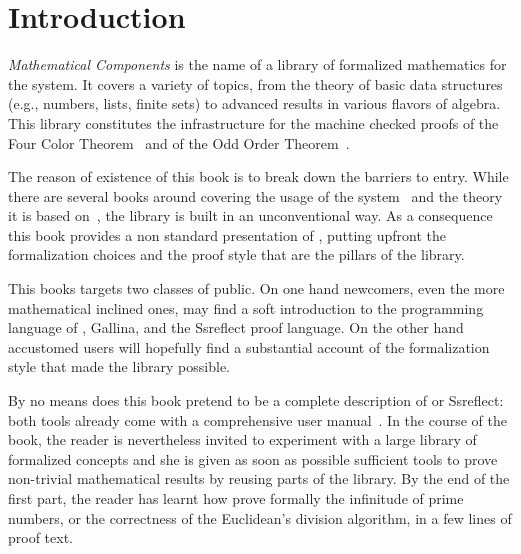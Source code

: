 \setcounter{chapter}{-1}
\chapter{Introduction}

\emph{Mathematical Components}
is the name of a library of formalized mathematics for the
\Coq{} system.  It covers a variety of
topics, from the theory of basic data structures (e.g., numbers, lists, finite
sets) to advanced results in various flavors of algebra. This library
constitutes the infrastructure for the machine checked proofs of the
Four Color Theorem~\cite{Gonthier08} and of the
Odd Order Theorem~\cite{gonthier:hal-00816699}.

The reason of existence of this book is to break down the barriers to entry.
While there are several books around covering the usage of the
\Coq{} system~\cite{BC04,SF,CPDT}
and the theory it is based
on~\cite[chapter 4]{Coq:manual}\cite{paulinmohring:hal-01094195,hottbook},
the \mcbMC{} library is built
in an unconventional way.  As a consequence this book provides a non
standard presentation of \Coq{}, putting upfront the formalization choices
and the proof style that are the pillars of the library.

This books targets two classes of public.  On one hand newcomers, even the
more mathematical inclined ones, may find a soft introduction to the programming
language of \Coq{}, Gallina, and the Ssreflect proof language.
On the other hand accustomed \Coq{} users will hopefully find a
substantial account of the formalization style that made the \mcbMC{}
library possible.


By no means does this book pretend to be a complete description of \Coq{} or
Ssreflect: both tools already come with a comprehensive user
manual~\cite{Coq:manual,ssrman}.
In the course of the book, the reader is nevertheless invited to
experiment with  a large library of formalized concepts and she is
given as soon as possible sufficient tools to prove non-trivial
mathematical results by reusing parts of the library. By the end of
the first part, the reader has learnt how prove formally the
infinitude of prime numbers, or the correctness of the Euclidean's
division algorithm, in a few lines of proof text.


